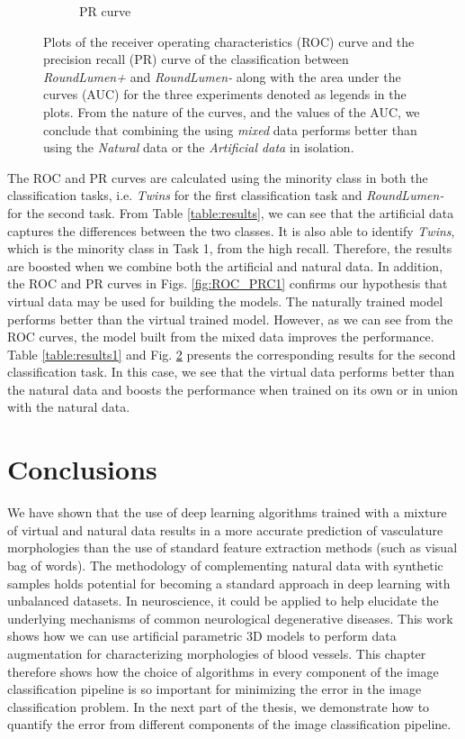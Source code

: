 \begin{figure}[ht!]
\begin{subfigure}[t]{0.5\textwidth}
  \caption{PR curve }
        \label{fig:PRC2}
    \end{subfigure}%
    \caption{Plots of the receiver operating characteristics (ROC) curve and the precision recall (PR) curve of the classification between \textit{RoundLumen+} and \textit{RoundLumen-} along with the area under the curves (AUC) for the three experiments denoted as legends in the plots. From the nature of the curves, and the values of the AUC, we conclude that combining the using \textit{mixed} data performs better than using the \textit{Natural} data or the \textit{Artificial data} in isolation.}
    \label{fig:ROC_PRC2}
\end{figure}

The ROC and PR curves are calculated using the minority class in both the classification tasks, i.e. \textit{Twins} for the first classification task and \textit{RoundLumen-} for the second task.
From Table \ref{table:results}, we can see that the artificial data captures the differences between the two classes. It is also able to identify \textit{Twins}, which is the minority class in Task 1, from the high recall. Therefore, the results are boosted when we combine both the artificial and natural data. In addition, the ROC and PR curves in Figs. \ref{fig:ROC_PRC1} confirms our hypothesis that virtual data may be used for building the models. The naturally trained model performs better than the virtual trained model. However, as we can see from the ROC curves, the model built from the mixed data improves the performance. Table \ref{table:results1} and Fig.  \ref{fig:ROC_PRC2} presents the corresponding results for the second classification task. In this case, we see that the virtual data performs better than the natural data and boosts the performance when trained on its own or in union with the natural data.

\section{Conclusions}
We have shown that the use of deep learning algorithms  trained with a mixture of virtual and natural data  results in a more accurate prediction of vasculature morphologies than the use of standard feature extraction methods (such as visual bag of words). The methodology of complementing natural data with synthetic samples holds potential for becoming a standard approach in deep learning with unbalanced datasets. In neuroscience, it could be applied to help elucidate the underlying mechanisms of common neurological degenerative diseases.
This work shows how we can use artificial parametric 3D models to perform data augmentation for characterizing morphologies of blood vessels. This chapter therefore shows how the choice of algorithms in every component of the image classification pipeline is so important for minimizing the error in the image classification problem. In the next part of the thesis, we demonstrate how to quantify the error from different components of the image classification pipeline.